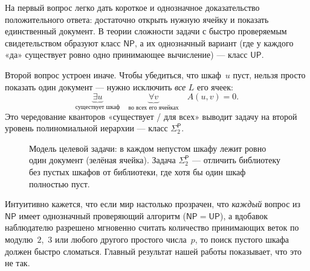\documentclass[11pt,a4paper]{article}
\newcommand{\NP}{\mathsf{NP}}
\newcommand{\UP}{\mathsf{UP}}
\newcommand{\SigTwo}{\Sigma_2^{\mathsf{P}}}
\begin{document}
На первый вопрос легко дать короткое и однозначное доказательство положительного ответа: достаточно открыть нужную ячейку и показать единственный документ. В теории сложности задачи с быстро проверяемым свидетельством образуют класс $\NP$, а их однозначный вариант (где у каждого «да» существует ровно одно принимающее вычисление) — класс $\UP$.

Второй вопрос устроен иначе. Чтобы убедиться, что шкаф~$u$ пуст, нельзя просто показать один документ — нужно исключить \emph{все} $L$ его ячеек:
\[
  \underbrace{\exists u}_{\text{существует шкаф}}
  \quad
  \underbrace{\forall v}_{\text{во всех его ячейках}}
  \quad A(u, v) = 0.
\]
Это чередование кванторов «существует / для всех» выводит задачу на второй уровень полиномиальной иерархии — класс $\SigTwo$.

\begin{figure}[!htbp]
\centering
{}
\caption{Модель целевой задачи: в каждом непустом шкафу лежит ровно один документ (зелёная ячейка). Задача $\SigTwo$ — отличить библиотеку без пустых шкафов от библиотеки, где хотя бы один шкаф полностью пуст.}
\end{figure}

Интуитивно кажется, что если мир настолько прозрачен, что \emph{каждый} вопрос из $\NP$ имеет однозначный проверяющий алгоритм ($\NP = \UP$), а вдобавок наблюдателю разрешено мгновенно считать количество принимающих веток по модулю~$2$,~$3$ или любого другого простого числа~$p$, то поиск пустого шкафа должен быстро сломаться. Главный результат нашей работы показывает, что это не так.
\end{document}
